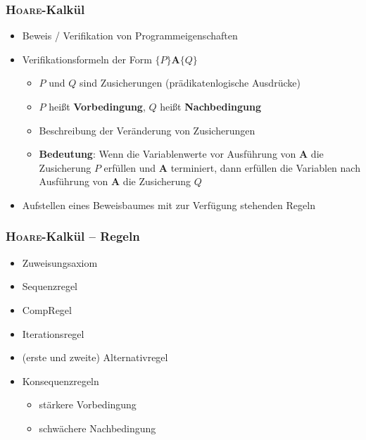 \documentclass[aspectratio=1610,onlymath, ngerman, handout]{beamer}
\renewcommand{\emph}[1]{\textbf{#1}}
\renewcommand{\epsilon}{\varepsilon}
\begin{document}
%    
    
    

    \begin{frame} \frametitle{\textsc{Hoare}-Kalkül}
    \small
    	\begin{itemize}
    		\item Beweis / Verifikation von Programmeigenschaften \pause 
    		\item Verifikationsformeln der Form $\{P\} \mathbf{A} \{Q\}$
    		\begin{itemize}
    			\item $P$ und $Q$ sind Zusicherungen (prädikatenlogische Ausdrücke)
    			\item $P$ heißt \emph{Vorbedingung}, $Q$ heißt \emph{Nachbedingung}
    			\item Beschreibung der Veränderung von Zusicherungen \pause
    			\item \emph{Bedeutung}: Wenn die Variablenwerte vor Ausführung von $\mathbf{A}$ die Zusicherung $P$ erfüllen und $\mathbf{A}$ terminiert, dann erfüllen die Variablen nach Ausführung von $\mathbf{A}$ die Zusicherung $Q$
    		\end{itemize} \pause
    	\item Aufstellen eines Beweisbaumes mit zur Verfügung stehenden Regeln
    	\end{itemize}
    \end{frame}
    
    
    \begin{frame} \frametitle{\textsc{Hoare}-Kalkül -- Regeln}
    \small
    	\begin{itemize}
    		\item Zuweisungsaxiom
    		\item Sequenzregel
    		\item CompRegel
    		\item Iterationsregel
    		\item (erste und zweite) Alternativregel
    		\item Konsequenzregeln
    		\begin{itemize}
    			\item stärkere Vorbedingung
    			\item schwächere Nachbedingung
    		\end{itemize}
    	\end{itemize}
    \end{frame}
\end{document}
